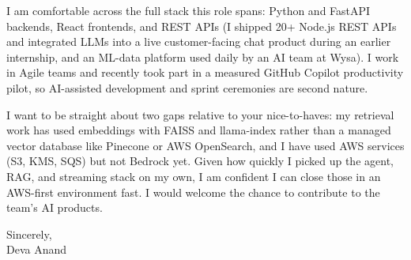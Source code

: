 \documentclass[letterpaper,11pt]{article}
\begin{document}
I am comfortable across the full stack this role spans: Python and FastAPI backends, React frontends, and REST APIs (I shipped 20+ Node.js REST APIs and integrated LLMs into a live customer-facing chat product during an earlier internship, and an ML-data platform used daily by an AI team at Wysa). I work in Agile teams and recently took part in a measured GitHub Copilot productivity pilot, so AI-assisted development and sprint ceremonies are second nature.

I want to be straight about two gaps relative to your nice-to-haves: my retrieval work has used embeddings with FAISS and llama-index rather than a managed vector database like Pinecone or AWS OpenSearch, and I have used AWS services (S3, KMS, SQS) but not Bedrock yet. Given how quickly I picked up the agent, RAG, and streaming stack on my own, I am confident I can close those in an AWS-first environment fast. I would welcome the chance to contribute to the team's AI products.

\vspace{6pt}
\noindent Sincerely, \\
Deva Anand
\end{document}
